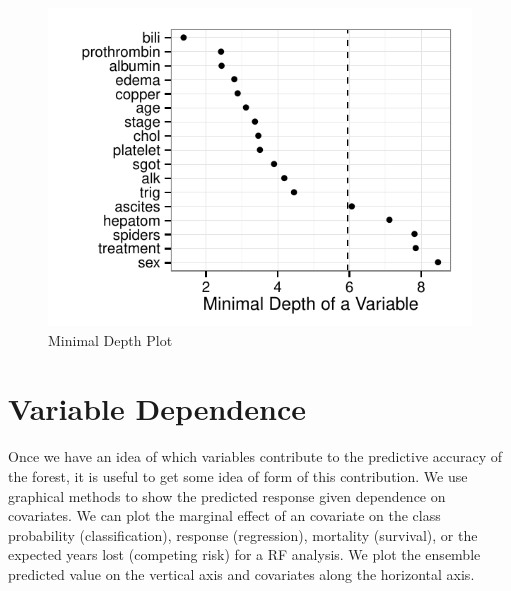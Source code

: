 \documentclass[nojss]{jss}\usepackage[]{graphicx}\usepackage[]{color}
\makeatletter
\def\maxwidth{ %
  \ifdim\Gin@nat@width>\linewidth
    \linewidth
  \else
    \Gin@nat@width
  \fi
}
\makeatother
\begin{document}
\begin{Schunk}
\begin{figure}[!htpb]

{\centering \includegraphics[width=\maxwidth]{figure/rfs-mindepth-plot-1} 

}

\caption[Minimal Depth Plot]{Minimal Depth Plot\label{fig:mindepth-plot}}
\end{figure}
\end{Schunk}


\section{Variable Dependence}\label{S:dependence}
Once we have an idea of which variables contribute to the predictive accuracy of the forest, it is useful to get some idea of form of this contribution. We use graphical methods to show the predicted response given dependence on covariates. We can plot the marginal effect of an covariate on the class probability (classification), response (regression), mortality (survival), or the expected years lost (competing risk) for a RF analysis. We plot the ensemble predicted value on the vertical axis and covariates along the horizontal axis.
\end{document}
